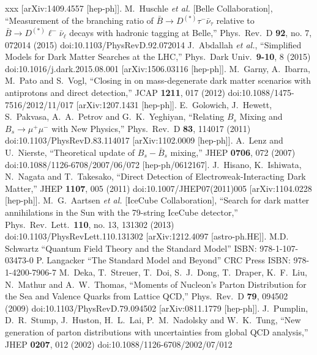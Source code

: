 \begin{thebibliography}{xxx}
  [arXiv:1409.4557 [hep-ph]].
    M.~Huschle {\it et al.} [Belle Collaboration],
  ``Measurement of the branching ratio of $\bar{B} \to D^{(\ast)} \tau^- \bar{\nu}_\tau$ relative to $\bar{B} \to D^{(\ast)} \ell^- \bar{\nu}_\ell$ decays with hadronic tagging at Belle,''
  Phys.\ Rev.\ D {\bf 92}, no. 7, 072014 (2015)
  doi:10.1103/PhysRevD.92.072014
    J.~Abdallah {\it et al.},
  ``Simplified Models for Dark Matter Searches at the LHC,''
  Phys.\ Dark Univ.\  {\bf 9-10}, 8 (2015)
  doi:10.1016/j.dark.2015.08.001
  [arXiv:1506.03116 [hep-ph]].
    M.~Garny, A.~Ibarra, M.~Pato and S.~Vogl,
  ``Closing in on mass-degenerate dark matter scenarios with antiprotons and direct detection,''
  JCAP {\bf 1211}, 017 (2012)
  doi:10.1088/1475-7516/2012/11/017
  [arXiv:1207.1431 [hep-ph]].
    E.~Golowich, J.~Hewett, S.~Pakvasa, A.~A.~Petrov and G.~K.~Yeghiyan,
  ``Relating $B_s$ Mixing and $B_s\to \mu^+\mu^-$ with New Physics,''
  Phys.\ Rev.\ D {\bf 83}, 114017 (2011)
  doi:10.1103/PhysRevD.83.114017
  [arXiv:1102.0009 [hep-ph]].
    A.~Lenz and U.~Nierste,
  ``Theoretical update of $B_s - \bar{B}_s$ mixing,''
  JHEP {\bf 0706}, 072 (2007)
  doi:10.1088/1126-6708/2007/06/072
  [hep-ph/0612167].
     J.~Hisano, K.~Ishiwata, N.~Nagata and T.~Takesako,
  ``Direct Detection of Electroweak-Interacting Dark Matter,''
  JHEP {\bf 1107}, 005 (2011)
  doi:10.1007/JHEP07(2011)005
  [arXiv:1104.0228 [hep-ph]].
    M.~G.~Aartsen {\it et al.} [IceCube Collaboration],
  ``Search for dark matter annihilations in the Sun with the 79-string IceCube detector,''
  Phys.\ Rev.\ Lett.\  {\bf 110}, no. 13, 131302 (2013)
  doi:10.1103/PhysRevLett.110.131302
  [arXiv:1212.4097 [astro-ph.HE]].
  M.D. Schwartz ``Quantum Field Theory and the Standard Model'' ISBN: 978-1-107-03473-0
  P. Langacker ``The Standard Model and Beyond'' CRC Press ISBN: 978-1-4200-7906-7
   M.~Deka, T.~Streuer, T.~Doi, S.~J.~Dong, T.~Draper, K.~F.~Liu, N.~Mathur and A.~W.~Thomas,
  ``Moments of Nucleon's Parton Distribution for the Sea and Valence Quarks from Lattice QCD,''
  Phys.\ Rev.\ D {\bf 79}, 094502 (2009)
  doi:10.1103/PhysRevD.79.094502
  [arXiv:0811.1779 [hep-ph]].
    J.~Pumplin, D.~R.~Stump, J.~Huston, H.~L.~Lai, P.~M.~Nadolsky and W.~K.~Tung,
  ``New generation of parton distributions with uncertainties from global QCD analysis,''
  JHEP {\bf 0207}, 012 (2002)
  doi:10.1088/1126-6708/2002/07/012

\end{thebibliography}
